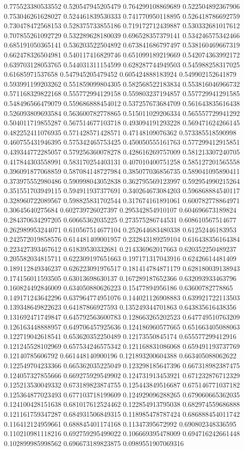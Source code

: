 \begin{table}
\begin{tabu}
\begin{sparkline}{10}
0.775523380533552 0.520547945205479 0.764299108869689 0.522504892367906 0.753046261628027 0.524461839530333 0.741770950118895 0.526418786692759 0.730478472568153 0.528375733855186 0.719172712439887 0.530332681017612 0.707855261092729 0.532289628180039 0.696528357379141 0.534246575342466 0.685191050365141 0.536203522504892 0.673841686797497 0.538160469667319 0.662478326504981 0.540117416829746 0.651099189219669 0.542074363992172 0.639703128053765 0.544031311154599 0.628287744949503 0.545988258317025 0.61685971537658 0.547945205479452 0.605424888183924 0.549902152641879 0.593991199203262 0.551859099804305 0.582568522183834 0.553816046966732 0.571168329822168 0.555772994129158 0.559803237194857 0.557729941291585 0.548496566479079 0.559686888454012 0.537257673684709 0.561643835616438 0.526093809693584 0.563600782778865 0.515011029206334 0.565557729941292 0.504011719855287 0.567514677103718 0.493094191293228 0.569471624266145 0.482252411076935 0.571428571428571 0.47148109076362 0.573385518590998 0.460755431946395 0.575342465753425 0.450050555161763 0.577299412915851 0.439344772285057 0.579256360078278 0.428616269757009 0.581213307240705 0.417844303558991 0.583170254403131 0.407010400751258 0.585127201565558 0.396091877068859 0.587084148727984 0.385077036856735 0.589041095890411 0.373975552980486 0.590998043052838 0.362795569123997 0.592954990215264 0.351551703949115 0.594911937377691 0.340264673084203 0.596868884540117 0.328960722089567 0.598825831702544 0.317674161891061 0.600782778864971 0.30645640275684 0.602739726027397 0.295342854910107 0.604696673189824 0.284370634297205 0.60665362035225 0.273575286744531 0.608610567514677 0.262989953244071 0.610567514677104 0.252644683480338 0.61252446183953 0.242572019858576 0.614481409001957 0.232843189259104 0.616438356164384 0.223427393467612 0.61839530332681 0.214336962017663 0.620352250489237 0.205582034815711 0.622309197651663 0.197171317043916 0.62426614481409 0.189112849346237 0.626223091976517 0.181414784871179 0.628180039138943 0.174156011593505 0.63013698630137 0.167289187652366 0.632093933463796 0.160824492846009 0.634050880626223 0.15477894956186 0.63600782778865 0.149171243642296 0.637964774951076 0.144021126908883 0.639921722113503 0.139348649822623 0.64187866927593 0.135249344701863 0.643835616438356 0.131692471749847 0.645792563600783 0.128663265202523 0.647749510763209 0.126163448888957 0.649706457925636 0.124186960577665 0.651663405088063 0.122719042618541 0.653620352250489 0.12173550845174 0.655577299412916 0.121245528102969 0.657534246575342 0.121168831086068 0.659491193737769 0.12140785606792 0.661448140900196 0.121893200604388 0.663405088062622 0.122549704233366 0.665362035225049 0.123298185647396 0.667318982387475 0.124057327855666 0.669275929549902 0.124731913453921 0.671232876712329 0.125213530049332 0.673189823874755 0.125443849516687 0.675146771037182 0.125364877023493 0.677103718199609 0.124929096288265 0.679060665362035 0.124100428151638 0.681017612524462 0.122854913795038 0.682974559686888 0.121161759347287 0.684931506849315 0.118985478787424 0.686888454011742 0.116412124959661 0.688845401174168 0.11347395672992 0.690802348336595 0.110210981118216 0.692759295499022 0.106669395478009 0.694716242661448 0.102899985998562 0.696673189823875 0.0989551907069316 
\end{sparkline}
\end{tabu}
\end{table}
